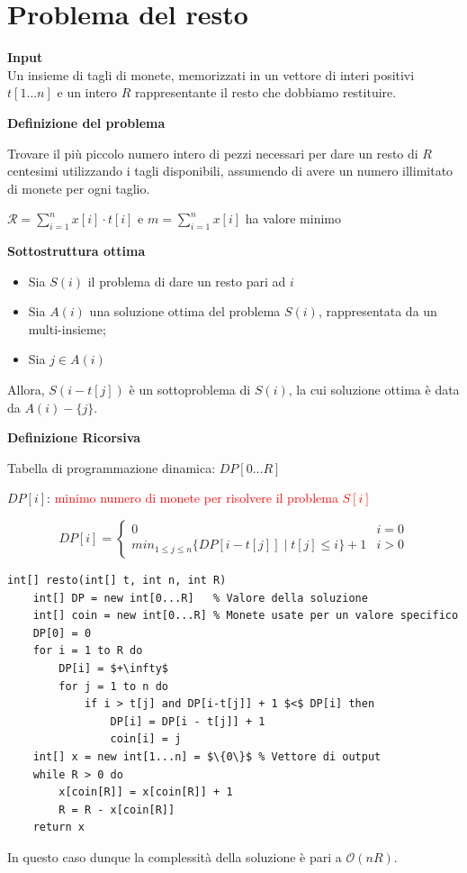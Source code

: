 \documentclass[../cheatSheetAlgoritmi.tex]{subfiles}
\begin{document}
\section{Problema del resto}
\textbf{Input}\\
Un insieme di tagli di monete, memorizzati in un vettore di interi positivi $t[1...n]$ e un intero $R$ rappresentante il resto che dobbiamo restituire.

\bigskip

\textbf{Definizione del problema}

Trovare il più piccolo numero intero di pezzi necessari per dare un resto di $R$ centesimi utilizzando i tagli disponibili, assumendo di avere un numero illimitato di monete per ogni taglio.
\begin{center}
	$\mathcal{R} = \sum_{i=1}^{n} x[i] \cdot t[i]$ e $m = \sum_{i = 1}^{n} x[i]$ ha valore minimo
\end{center}
\textbf{Sottostruttura ottima}
\begin{itemize}
	\item Sia $S(i)$ il problema di dare un resto pari ad $i$
	\item Sia $A(i)$ una soluzione ottima del problema $S(i)$, rappresentata da un multi-insieme; 
	\item Sia $j \in A(i)$
\end{itemize}
Allora, $S(i - t[j])$ è un sottoproblema di $S(i)$, la cui soluzione ottima è data da $A(i) - \{j\}$.

\bigskip

\textbf{Definizione Ricorsiva}

Tabella di programmazione dinamica: $DP[0...R]$

$DP[i]$: \textcolor{red}{minimo numero di monete per risolvere il problema $S[i]$}

\begin{equation*}
  	DP[i]=\begin{cases}
   		0  & \text{$i = 0$}\\
   		min_{1 \leq j \leq n}\{DP[i - t[j]] \mid t[j] \leq i\} + 1 & \text{$i > 0$}
  	\end{cases}
\end{equation*}
\begin{lstlisting}[caption=Resto (DP)]
int[] resto(int[] t, int n, int R)
	int[] DP = new int[0...R] 	% Valore della soluzione
	int[] coin = new int[0...R]	% Monete usate per un valore specifico
	DP[0] = 0
	for i = 1 to R do
		DP[i] = $+\infty$
		for j = 1 to n do
			if i > t[j] and DP[i-t[j]] + 1 $<$ DP[i] then
				DP[i] = DP[i - t[j]] + 1
				coin[i] = j
	int[] x = new int[1...n] = $\{0\}$ % Vettore di output
	while R > 0 do
		x[coin[R]] = x[coin[R]] + 1
		R = R - x[coin[R]]
	return x
\end{lstlisting}
In questo caso dunque la complessità della soluzione è pari a $\mathcal{O}(nR)$.
\end{document}
